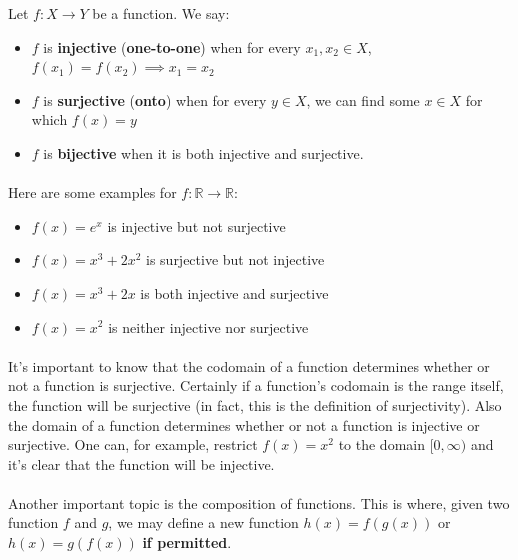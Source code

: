 \documentclass[12pt, a4paper, titlepage, twoside]{article}
\newcommand*{\R}{\mathbb{R}}
\begin{document}
	\begin{kp}
		Let $f : X \to Y$ be a function. We say:
		\begin{itemize}
			\item $f$ is \textbf{injective} (\textbf{one-to-one}) when for every $x_1, x_2 \in X$, $f(x_1) = f(x_2) \implies x_1 = x_2$
			\item $f$ is \textbf{surjective} (\textbf{onto}) when for every $y \in X$, we can find some $x \in X$ for which $f(x) = y$
			\item $f$ is \textbf{bijective} when it is both injective and surjective.
		\end{itemize}
	\end{kp}
	
	\paragraph{}
	Here are some examples for $f : \R \to \R$:
	
	\begin{itemize}
		\item $f(x) = e^x$ is injective but not surjective
		\item $f(x) = x^3 + 2x^2$ is surjective but not injective
		\item $f(x) = x^3 + 2x$ is both injective and surjective
		\item $f(x) = x^2$ is neither injective nor surjective
	\end{itemize}
	
	\paragraph{}
	It's important to know that the codomain of a function determines whether or not a function is surjective. Certainly if a function's codomain
	is the range itself, the function will be surjective (in fact, this is the definition of surjectivity). Also the domain of a function determines whether 
	or not a function is injective or surjective. One can, for example, restrict $f(x) = x^2$ to the domain $[0,\infty)$ and it's clear that the function
	will be injective.
	
	\paragraph{}
	Another important topic is the composition of functions. This is where, given two function $f$ and $g$, we may define a new function
	$h(x) = f(g(x))$ or $h(x) = g(f(x))$ \textbf{if permitted}.\\
	
\end{document}
